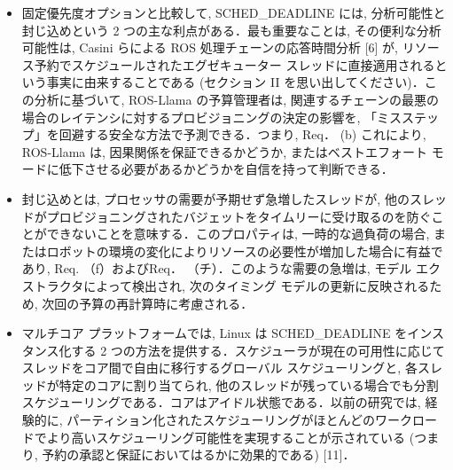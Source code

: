 \begin{frame}{}
    \begin{itemize}
        \item 固定優先度オプションと比較して, SCHED\_DEADLINE には, 分析可能性と封じ込めという 2 つの主な利点がある．最も重要なことは, その便利な分析可能性は, Casini らによる ROS 処理チェーンの応答時間分析 [6] が, リソース予約でスケジュールされたエグゼキューター スレッドに直接適用されるという事実に由来することである (セクション II を思い出してください)．この分析に基づいて, ROS-Llama の予算管理者は, 関連するチェーンの最悪の場合のレイテンシに対するプロビジョニングの決定の影響を, 「ミスステップ」を回避する安全な方法で予測できる．つまり, Req． (b) これにより, ROS-Llama は, 因果関係を保証できるかどうか, またはベストエフォート モードに低下させる必要があるかどうかを自信を持って判断できる．
    \end{itemize}
\end{frame}

\begin{frame}{}
    \begin{itemize}
        \item 封じ込めとは, プロセッサの需要が予期せず急増したスレッドが, 他のスレッドがプロビジョニングされたバジェットをタイムリーに受け取るのを防ぐことができないことを意味する．このプロパティは, 一時的な過負荷の場合, またはロボットの環境の変化によりリソースの必要性が増加した場合に有益であり, Req. （f）およびReq． （チ）．このような需要の急増は, モデル エクストラクタによって検出され, 次のタイミング モデルの更新に反映されるため, 次回の予算の再計算時に考慮される．
    \end{itemize}
\end{frame}

\begin{frame}{}
    \begin{itemize}
        \item マルチコア プラットフォームでは, Linux は SCHED\_DEADLINE をインスタンス化する 2 つの方法を提供する．スケジューラが現在の可用性に応じてスレッドをコア間で自由に移行するグローバル スケジューリングと, 各スレッドが特定のコアに割り当てられ, 他のスレッドが残っている場合でも分割スケジューリングである．コアはアイドル状態である．以前の研究では, 経験的に, パーティション化されたスケジューリングがほとんどのワークロードでより高いスケジューリング可能性を実現することが示されている (つまり, 予約の承認と保証においてはるかに効果的である) [11]．
    \end{itemize}
\end{frame}

